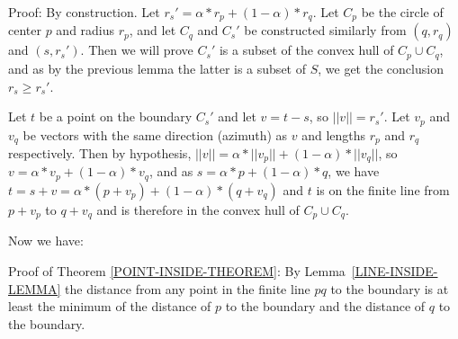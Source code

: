 \documentclass[12pt]{article}
\begin{document}
\begin{indpar}{0.2in}
Proof:  By construction.  Let $r_s'=\alpha*r_p+(1-\alpha)*r_q$.
Let $C_p$ be the circle of center $p$ and
radius $r_p$, and let $C_q$ and $C_s'$ be constructed similarly from
$(q,r_q)$ and $(s,r_s')$.  Then we will prove $C_s'$ is a subset of
the convex hull of $C_p\cup C_q$, and as by the previous lemma
the latter is a subset of $S$, we get the conclusion $r_s\ge r_s'$.

Let $t$ be a point on the boundary $C_s'$ and let $v=t-s$, so
$||v||=r_s'$.  Let $v_p$ and $v_q$ be vectors
with the same direction (azimuth) as $v$ and lengths $r_p$ and $r_q$
respectively.  Then by hypothesis,
$||v|| = \alpha*||v_p||+(1-\alpha)*||v_q||$, so
$v = \alpha*v_p+(1-\alpha)*v_q$, and as
$s = \alpha*p+(1-\alpha)*q$, we have
$t=s+v=\alpha*(p+v_p)+(1-\alpha)*(q+v_q)$ and 
$t$ is on the finite line from $p+v_p$ to $q+v_q$ and is therefore in the
convex hull of $C_p\cup C_q$.
\end{indpar}

Now we have:

\begin{indpar}{0.2in}
Proof of Theorem \ref{POINT-INSIDE-THEOREM}:
By Lemma~\ref{LINE-INSIDE-LEMMA} the distance from any point in
the finite line $pq$ to the boundary is at least the minimum
of the distance of $p$ to the boundary and the distance of $q$
to the boundary.
\end{indpar}



\newpage
\end{document}
